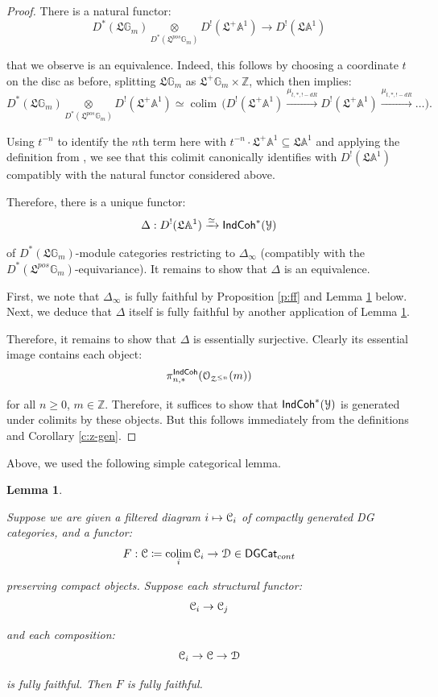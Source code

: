 \documentclass[reqno,11pt]{amsart}
\numberwithin{equation}{subsection}
\newtheorem{lem}[thm]{Lemma}
\theoremstyle{remark}
\newcommand{\xar}[1]{\xrightarrow{#1}}
\newcommand{\rar}[1]{\xar{#1}}
\newcommand{\isom}{\rar{\simeq}}
\newcommand{\bA}{{\mathbb A}}
\newcommand{\bG}{{\mathbb G}}
\newcommand{\bZ}{{\mathbb Z}}
\newcommand{\sC}{{\EuScript C}}
\newcommand{\sD}{{\EuScript D}}
\newcommand{\sO}{{\EuScript O}}
\newcommand{\sY}{{\EuScript Y}}
\newcommand{\sZ}{{\EuScript Z}}
\newcommand{\fL}{{\mathfrak L}}
\newcommand{\on}{\operatorname}
\newcommand{\colim}{\on{colim}}
\newcommand{\DGCat}{\mathsf{DGCat}}
\newcommand{\IndCoh}{\mathsf{IndCoh}}
\renewcommand{\subset}{\subseteq}
\begin{document}
\begin{proof}

There is a natural functor:
%
\[
D^*(\fL\bG_m) \underset{D^*(\fL^{pos}\bG_m)}{\otimes} D^!(\fL^+\bA^1) \to 
D^!(\fL\bA^1)
\]

\noindent that we observe is an equivalence. Indeed, this follows
by choosing a coordinate $t$ on the disc as before, splitting
$\fL\bG_m$ as $\fL^+\bG_m \times \bZ$, which then implies: 
%
\[
D^*(\fL\bG_m) \underset{D^*(\fL^{pos}\bG_m)}{\otimes} D^!(\fL^+\bA^1) \simeq 
\colim \, \big(D^!(\fL^+\bA^1) \xar{\mu_{t,*,!-dR}} D^!(\fL^+\bA^1) 
\xar{\mu_{t,*,!-dR}} \ldots \big).
\]

\noindent Using $t^{-n}$ to identify the $n$th term here with 
$t^{-n} \cdot \fL^+ \bA^1 \subset \fL \bA^1$ and applying the
definition from \cite{dmod}, we see that this 
colimit canonically identifies with $D^!(\fL\bA^1)$ compatibly with the
natural functor considered above.

Therefore, there is a unique functor:
%
\[
\Delta:D^!(\fL\bA^1) \isom  \IndCoh^*(\sY) 
\]

\noindent of $D^*(\fL\bG_m)$-module categories restricting to 
$\Delta_{\infty}$ (compatibly with the $D^*(\fL^{pos}\bG_m)$-equivariance).
It remains to show that $\Delta$ is an equivalence.

First, we note that $\Delta_{\infty}$ is fully faithful by 
Proposition \ref{p:ff} and Lemma \ref{l:colim-ff} below. Next,
we deduce that $\Delta$ itself is fully faithful by another
application of Lemma \ref{l:colim-ff}. 

Therefore, it remains to show that $\Delta$ is essentially surjective.
Clearly its essential image contains each object:
%
\[
\pi_{n,*}^{\IndCoh}(\sO_{\sZ^{\leq n}}(m))
\]

\noindent for all $n \geq 0$, $m \in \bZ$. Therefore, it suffices
to show that $\IndCoh^*(\sY)$ is generated under colimits by these objects.
But this follows immediately from the definitions and Corollary \ref{c:z-gen}.

\end{proof}

Above, we used the following simple categorical lemma.

\begin{lem}\label{l:colim-ff}

Suppose we are given a filtered diagram $i \mapsto \sC_i$ of compactly 
generated DG categories, and a functor:
%
\[
F:\sC \coloneqq \underset{i}{\colim} \, \sC_i \to \sD \in \DGCat_{cont}
\]

\noindent preserving compact objects. Suppose each structural functor:
%
\[
\sC_i \to \sC_j
\]

\noindent and each composition:
%
\[
\sC_i \to \sC \to \sD
\]

\noindent is fully faithful. Then $F$ is fully faithful.

\end{lem}



{}

\end{document}
